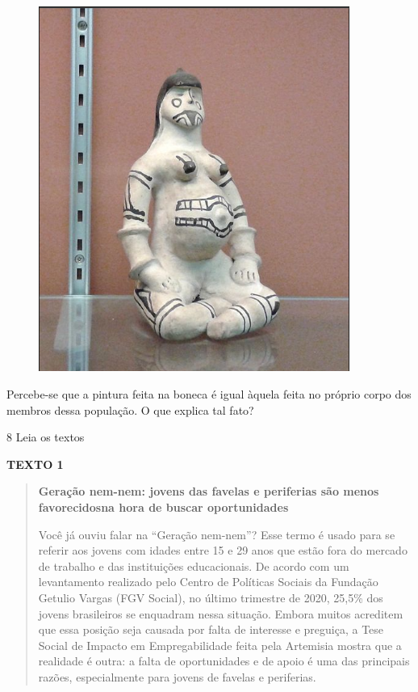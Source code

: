 \begin{figure}
\centering
\includegraphics[width=4.00813in,height=4.70245in]{./imgSAEB_9_CHUM3/media/image1.png}
\end{figure}

Percebe-se que a pintura feita na boneca é igual àquela feita no
próprio corpo dos membros dessa população. O que explica tal fato?


\num{8} Leia os textos

\textbf{TEXTO 1}

\begin{quote}
\textbf{Geração nem-nem: jovens das favelas e periferias são menos favorecidosna hora de buscar oportunidades}

Você já ouviu falar na ``Geração nem-nem''? Esse termo é usado para se
referir aos jovens com idades entre 15 e 29 anos que estão fora do
mercado de trabalho e das instituições educacionais. De acordo com um
levantamento realizado pelo Centro de Políticas Sociais da Fundação
Getulio Vargas (FGV Social), no último trimestre de 2020, 25,5\% dos
jovens brasileiros se enquadram nessa situação. Embora muitos acreditem
que essa posição seja causada por falta de interesse e preguiça, a Tese
Social de Impacto em Empregabilidade feita pela Artemisia mostra que a
realidade é outra: a falta de oportunidades e de apoio é uma das
principais razões, especialmente para jovens de favelas e periferias.

\end{quote}


